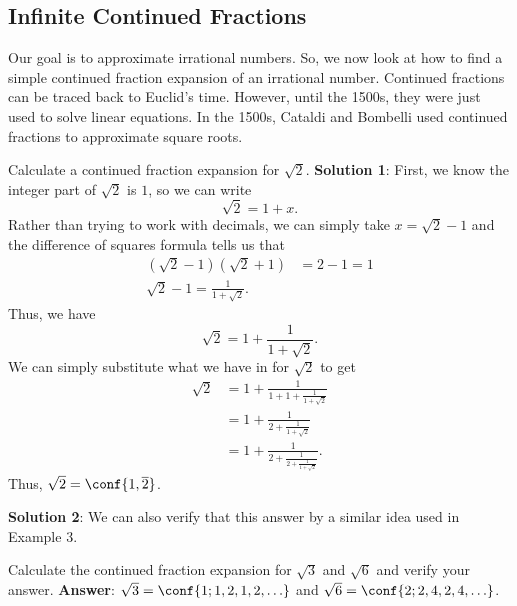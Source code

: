 \subsection*{Infinite Continued Fractions}
Our goal is to approximate
irrational numbers. So, we now look at how to find
a simple continued fraction expansion
of an irrational number. Continued fractions can be traced back to Euclid's time.
However, until the 1500s, they were just used to solve linear equations.
In the 1500s, Cataldi and Bombelli used continued fractions to approximate square roots.

\begin{Example}{}{}
    Calculate a continued fraction expansion for $ \sqrt{2} $.
    \tcblower{}
    \textbf{Solution 1}: First, we know the integer part of $ \sqrt{2} $
    is $ 1 $, so we can write
    \[ \sqrt{2}=1+x. \]
    Rather than trying to work with decimals, we can simply take
    $ x=\sqrt{2}-1 $ and the difference of squares formula tells us that
    \begin{align*}
        (\sqrt{2}-1)(\sqrt{2}+1) & =2-1=1 \\
        \sqrt{2}-1=\frac{1}{1+\sqrt{2}}.
    \end{align*}
    Thus, we have
    \[ \sqrt{2}=1+\frac{1}{1+\sqrt{2}}. \]
    We can simply substitute what we have in for $ \sqrt{2} $ to get
    \begin{align*}
        \sqrt{2}
         & =1+\frac{1}{1+1+\frac{1}{1+\sqrt{2}}}            \\
         & =1+\frac{1}{2+\frac{1}{1+\sqrt{2}}}              \\
         & =1+\frac{1}{2+\frac{1}{2+\frac{1}{1+\sqrt{2}}}}.
    \end{align*}
    Thus, $ \sqrt{2}=\conf{1,\overline{2}} $.

    \textbf{Solution 2}: We can also verify that this answer by a similar idea used in Example 3.
\end{Example}
\begin{Exercise}{}{}
    Calculate the continued fraction expansion for $ \sqrt{3} $
    and $ \sqrt{6} $ and verify your answer.
    \tcblower{}
    \textbf{Answer}: $ \sqrt{3}=\conf{1;1,2,1,2,\ldots} $
    and $ \sqrt{6}=\conf{2;2,4,2,4,\ldots} $.
\end{Exercise}
